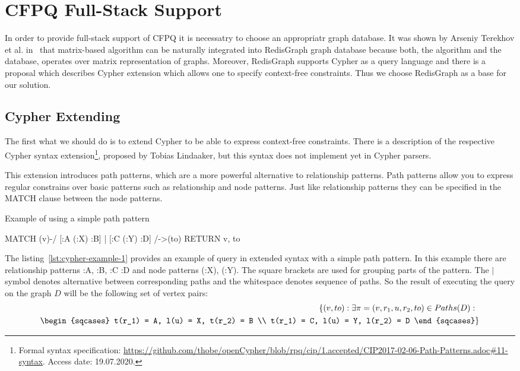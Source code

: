\section{CFPQ Full-Stack Support}

In order to provide full-stack support of CFPQ it is necessatry to choose an appropriatr graph database.
It was shown by Arseniy Terekhov et al. in~\cite{10.1145/3398682.3399163} that matrix-based algorithm can be naturally integrated into RedisGraph graph database because both, the algorithm and the database, operates over matrix representation of graphs.
Moreover, RedisGraph supports Cypher as a query language and there is a proposal which describes Cypher extension which allows one to specify context-free constraints.
Thus we choose RedisGraph as a base for our solution.  


\subsection{Cypher Extending}
\label{subsec:cypher-extension}

The first what we should do is to extend Cypher to be able to express context-free constraints.
There is a description of the respective Cypher syntax extension\footnote{\label{cypher-proposal}Formal syntax specification: \url{https://github.com/thobe/openCypher/blob/rpq/cip/1.accepted/CIP2017-02-06-Path-Patterns.adoc\#11-syntax}. Access date: 19.07.2020.}, proposed by Tobias Lindaaker, but this syntax does not implement yet in Cypher parsers.

This extension introduces path patterns, which are a more powerful alternative to relationship patterns. Path patterns allow you to express regular constrains over basic patterns such as relationship and node patterns. Just like relationship patterns they can be specified in the MATCH clause between the node patterns.

\begin{algorithm}
\begin{algorithmic}[1]
\caption{Example of using a simple path pattern}
\label{lst:cypher-example-1}
\State MATCH (v)-/ [:A (:X) :B] | [:C (:Y) :D] /->(to)
\State RETURN v, to
\end{algorithmic}
\end{algorithm}

The listing~\ref{lst:cypher-example-1} provides an example of query in extended syntax with a simple path pattern. In this example there are relationship patterns :A, :B, :C :D and node patterns (:X), (:Y). The square brackets are used for grouping parts of the pattern. The $|$ symbol denotes alternative between corresponding paths and the whitespace denotes sequence of paths. So the result of executing the query on the graph $D$ will be the following set of vertex pairs:
\begin{align*}
\{(v, to): \exists \pi = (v,r_1,u,r_2,to) \in Paths(D):& \\
\begin{sqcases}
    t(r_1) = A, l(u) = X, t(r_2) = B  \\
    t(r_1) = C, l(u) = Y, l(r_2) = D
\end{sqcases}&\}
\end{align*}

